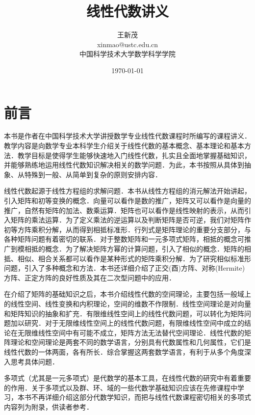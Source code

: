 \documentclass[a4paper,fontset=windows]{ctexbook}
\theoremstyle{definition}
\begin{document}
\title{\Huge\bf 线性代数讲义}
\author{
{\huge 王新茂} \\[10pt]
\LARGE xinmao@ustc.edu.cn \\[10pt]
\LARGE 中国科学技术大学数学科学学院 \\[20pt]
}
\date{\LARGE\today}
\maketitle

\chapter*{前言}

本书是作者在中国科学技术大学讲授数学专业线性代数课程时所编写的课程讲义．教学内容是向数学专业本科学生介绍关于线性代数的基本概念、基本理论和基本方法．教学目标是使得学生能够快速地入门线性代数，扎实且全面地掌握基础知识，并能够熟练地运用线性代数知识解决相关的数学问题．为此，本书按照从具体到抽象、从特殊到一般、从简单到复杂的原则安排内容．

线性代数起源于线性方程组的求解问题．本书从线性方程组的消元解法开始讲起，引入矩阵和初等变换的概念．向量可以看作是数的推广，矩阵又可以看作是向量的推广，自然有矩阵的加法、数乘运算．矩阵也可以看作是线性映射的表示，从而引入矩阵的乘法运算．为了定义乘法的逆运算以及判断矩阵是否可逆，我们对矩阵作初等方阵乘积分解，从而得到相抵标准形．行列式是矩阵理论的重要分支部分，与各种矩阵问题有着密切的联系．对于整数矩阵和一元多项式矩阵，相抵的概念可推广到模相抵的概念．为了解决矩阵方幂的计算问题，引入了相似的概念．矩阵的相抵、相似、相合关系都可以看作是某种形式的矩阵乘积分解．为了研究相似标准形问题，引入了多种概念和方法．本书还详细介绍了正交(酉)方阵、对称(Hermite)方阵、正定方阵的良好性质及其在二次型问题中的应用．

在介绍了矩阵的基础知识之后，本书介绍线性代数的空间理论，主要包括一般域上的线性空间、线性变换和内积理论，空间的维数不作限制．线性空间理论是对向量和矩阵知识的抽象和扩充．有限维线性空间上的线性代数问题，可以转化为矩阵问题加以研究．对于无限维线性空间上的线性代数问题，有限维线性空间中成立的结论在无限维线性空间中有可能不成立，矩阵方法无法替代空间理论．线性代数的矩阵理论和空间理论是两套不同的数学语言，分别具有代数属性和几何属性，它们是线性代数的一体两面，各有所长．综合掌握这两套数学语言，有利于从多个角度深入思考具体问题．

多项式（尤其是一元多项式）是代数学的基本工具，在线性代数的研究中有着重要的作用．关于多项式以及群、环、域的一些代数学基础知识应该在先修课程中学习，本书不再详细介绍这部分代数学知识，而把与线性代数课程密切相关的多项式内容列为附录，供读者参考．
\end{document}
